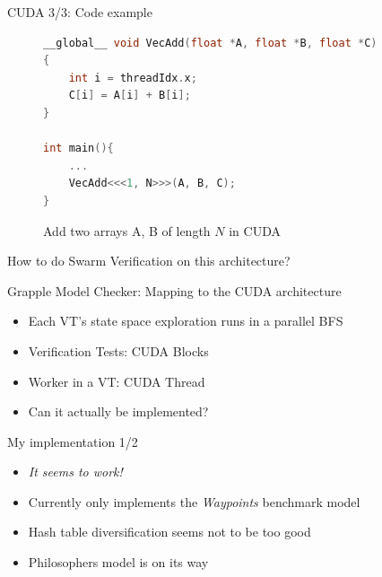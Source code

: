 \documentclass[aspectratio=169]{beamer}
\begin{document}
\begin{frame}[fragile]{CUDA 3/3: Code example}
    \begin{figure}
        \centering
        \begin{minipage}{.7\linewidth}
            \begin{lstlisting}[basicstyle=\scriptsize,language=c]
__global__ void VecAdd(float *A, float *B, float *C)
{
    int i = threadIdx.x;
    C[i] = A[i] + B[i];
}

int main(){
    ...
    VecAdd<<<1, N>>>(A, B, C);
}
            \end{lstlisting}
        \end{minipage}
        \caption{Add two arrays A, B of length $N$ in CUDA}
        \label{fig:cuda-add-arrays}
    \end{figure}

    How to do Swarm Verification on this architecture?
\end{frame}

\begin{frame}{Grapple Model Checker: Mapping to the CUDA architecture}

    \begin{itemize}
        \item Each VT's state space exploration runs in a parallel BFS
        \item Verification Tests: CUDA Blocks
        \item Worker in a VT: CUDA Thread
        \item Can it actually be implemented?
    \end{itemize}
\end{frame}

\begin{frame}{My implementation 1/2}
    \begin{itemize}
        \item \emph{It seems to work!}
        \item Currently only implements the \emph{Waypoints} benchmark model
        \item Hash table diversification seems not to be too good
        \item Philosophers model is on its way
    \end{itemize}
\end{frame}
\end{document}
